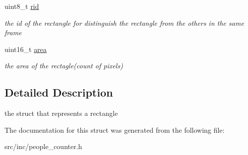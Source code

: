 \begin{DoxyCompactItemize}
\mbox{\label{structrec_a48746004dd690b5a7aab35f2661a7e74}} 
uint8\+\_\+t \mbox{\hyperlink{structrec_a48746004dd690b5a7aab35f2661a7e74}{rid}}
\begin{DoxyCompactList}\small\item\em the id of the rectangle for distinguish the rectangle from the others in the same frame \end{DoxyCompactList}\item 
\mbox{\label{structrec_a216e784a8cd53d73170d18742effc84f}} 
uint16\+\_\+t \mbox{\hyperlink{structrec_a216e784a8cd53d73170d18742effc84f}{area}}
\begin{DoxyCompactList}\small\item\em the area of the rectagle(count of pixels) \end{DoxyCompactList}\end{DoxyCompactItemize}


\subsection{Detailed Description}
the struct that represents a rectangle 

The documentation for this struct was generated from the following file\+:\begin{DoxyCompactItemize}
\item 
src/inc/people\+\_\+counter.\+h\end{DoxyCompactItemize}
